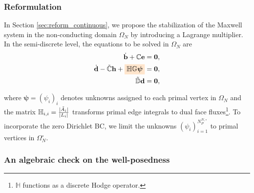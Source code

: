 \documentclass{article}
\begin{document}
\subsubsection{Reformulation} \label{sec:reform_discrete}
In Section \ref{sec:reform_continuous}, we propose the stabilization of the Maxwell system in the non-conducting domain $\Omega_N$ by introducing a Lagrange multiplier. In the semi-discrete level, the equations to be solved in $\Omega_N$ are
\begin{subequations}
    \begin{align}
        \dot{\mathbf{b}} + \mathbb{C}\mathbf{e} &= \mathbf{0} ,\\
        \dot{\mathbf{d}} - \Tilde{\mathbb{C}}\mathbf{h} + \colorbox{orange!20}{$\mathbb{H} \mathbb{G} \bm{\psi}$}&= \mathbf{0},\\
        \Tilde{\mathbb{D}}\mathbf{d} &= \mathbf{0} \label{equ:discrete_zero_div}, 
    \end{align} 
\end{subequations}

where $\bm{\psi} = (\psi_i)_i$ denotes unknowns assigned to each primal vertex in $\Omega_N$ and the matrix $\mathbb{H}_{i,i} = \frac{|\Tilde{A}_i|}{|L_i|}$ transforms primal edge integrals to dual face fluxes\footnote{$\mathbb{H}$ functions as a discrete Hodge operator.}. To incorporate the zero Dirichlet BC, we limit the unknowns $(\psi_i)_{i=1}^{N^{N,\circ}_P}$ to primal vertices in $\Omega_N^\circ$.

\subsubsection{An algebraic check on the well-posedness}
\end{document}
